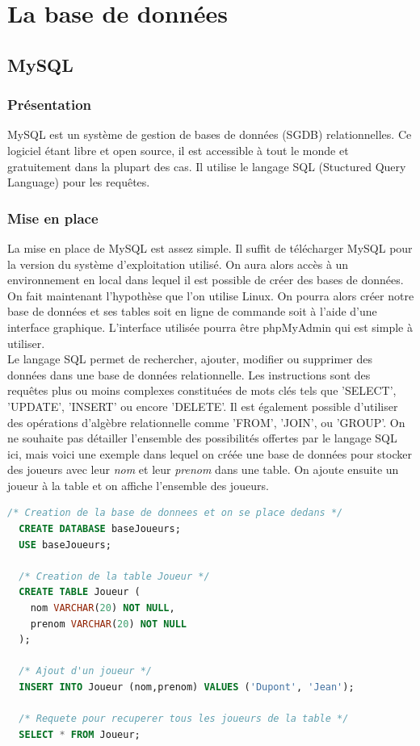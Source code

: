 \section{La base de données}

\subsection{MySQL}

\subsubsection{Présentation}
MySQL est un système de gestion de bases de données (SGDB) relationnelles. Ce logiciel étant libre et open source, il est accessible à tout le monde et gratuitement dans la plupart des cas.
Il utilise le langage SQL (Stuctured Query Language) pour les requêtes.

\subsubsection{Mise en place}
La mise en place de MySQL est assez simple. Il suffit de télécharger MySQL pour la version du système d'exploitation utilisé. On aura alors accès à un environnement en local dans lequel il est possible de créer des bases de données.\\

On fait maintenant l'hypothèse que l'on utilise Linux. On pourra alors créer notre base de données et ses tables soit en ligne de commande soit à l'aide d'une interface graphique. L'interface utilisée pourra être phpMyAdmin qui est simple à utiliser.\\

Le langage SQL permet de rechercher, ajouter, modifier ou supprimer des données dans une base de données relationnelle. Les instructions sont des requêtes plus ou moins complexes constituées de mots clés tels que 'SELECT', 'UPDATE', 'INSERT' ou encore 'DELETE'. Il est également possible d'utiliser des opérations d'algèbre relationnelle comme 'FROM', 'JOIN', ou 'GROUP'.
On ne souhaite pas détailler l'ensemble des possibilités offertes par le langage SQL ici, mais voici une exemple dans lequel on créée une base de données pour stocker des joueurs avec leur \textit{nom} et leur \textit{prenom} dans une table. On ajoute ensuite un joueur à la table et on affiche l'ensemble des joueurs.
\begin{lstlisting}[language=SQL]
  /* Creation de la base de donnees et on se place dedans */
  CREATE DATABASE baseJoueurs;
  USE baseJoueurs;
  
  /* Creation de la table Joueur */
  CREATE TABLE Joueur (
    nom VARCHAR(20) NOT NULL,
    prenom VARCHAR(20) NOT NULL
  );
  
  /* Ajout d'un joueur */
  INSERT INTO Joueur (nom,prenom) VALUES ('Dupont', 'Jean');
  
  /* Requete pour recuperer tous les joueurs de la table */
  SELECT * FROM Joueur;
\end{lstlisting}


